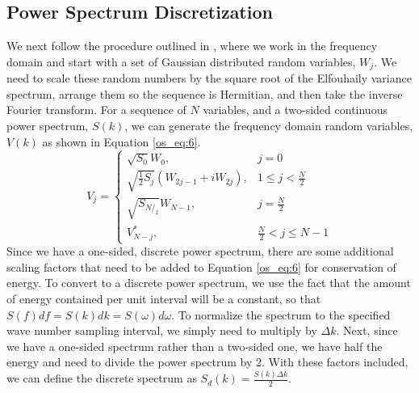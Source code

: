\subsection{Power Spectrum Discretization}
We next follow the procedure outlined in \cite{percival_spectra},  where we work in the frequency domain and start with a set of Gaussian distributed random variables, $W_j$. We need to scale these random numbers by the square root of the Elfouhaily variance spectrum, arrange them so the sequence is Hermitian, and then take the inverse Fourier transform. For a sequence of $N$ variables, and a two-sided continuous power spectrum, $S(k)$, we can generate the frequency domain random variables, $V(k)$ as shown in Equation \ref{os_eq:6}.
\begin{equation}
  \label{os_eq:6}   
  V_j = \begin{cases}
    \sqrt{S_0}W_0, & j = 0 \\
    \sqrt{\frac{1}{2}S_j}\left(W_{2j-1} + iW_{2j} \right), & 1 \leq j <\frac{N}{2} \\
    \sqrt{S_{N/_2}}W_{N-1}, & j = \frac{N}{2} \\
    V_{N-j}^*, &  \frac{N}{2} < j \leq N-1 
  \end{cases} 
\end{equation}
Since we have a one-sided, discrete power spectrum, there are some additional scaling factors that need to be added to Equation \ref{os_eq:6} for conservation of energy. To convert to a discrete power spectrum, we use the fact that the amount of energy contained per unit interval will be a constant, so that $S(f)df = S(k)dk = S(\omega) d\omega$. To normalize the spectrum to the specified wave number sampling interval, we simply need to multiply by $\Delta k$. Next, since we have a one-sided spectrum rather than a two-sided one, we have half the energy and need to divide the power spectrum by 2. With these factors included, we can define the discrete spectrum as $S_d(k) = \frac{S(k)\Delta k}{2}$.

